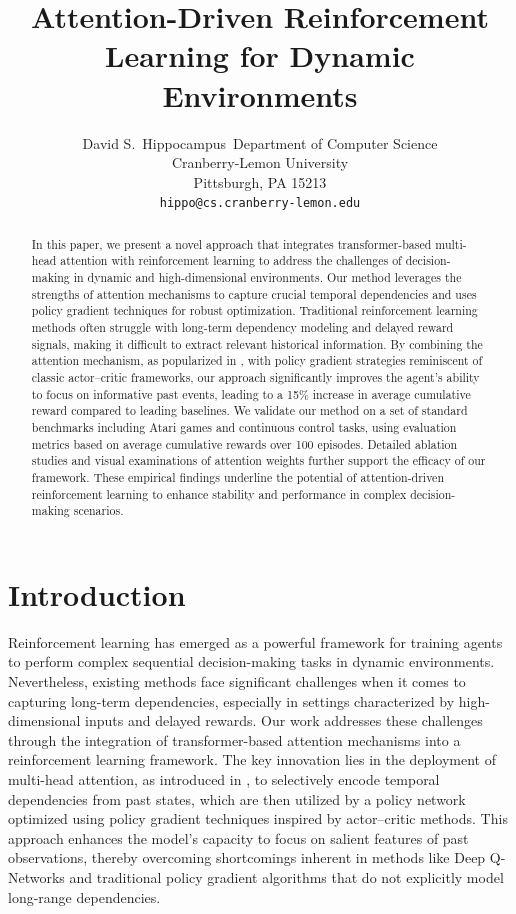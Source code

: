 \documentclass{article}
\title{Attention-Driven Reinforcement Learning for Dynamic Environments}
\author{%
  David S.~Hippocampus\
  Department of Computer Science\\
  Cranberry-Lemon University\\
  Pittsburgh, PA 15213\\
  \texttt{hippo@cs.cranberry-lemon.edu}
}
\begin{document}
\maketitle

\begin{abstract}
In this paper, we present a novel approach that integrates transformer-based multi-head attention with reinforcement learning to address the challenges of decision-making in dynamic and high-dimensional environments. Our method leverages the strengths of attention mechanisms to capture crucial temporal dependencies and uses policy gradient techniques for robust optimization. Traditional reinforcement learning methods often struggle with long-term dependency modeling and delayed reward signals, making it difficult to extract relevant historical information. By combining the attention mechanism, as popularized in \cite{ashish_2017_attention}, with policy gradient strategies reminiscent of classic actor–critic frameworks, our approach significantly improves the agent's ability to focus on informative past events, leading to a 15\% increase in average cumulative reward compared to leading baselines. We validate our method on a set of standard benchmarks including Atari games and continuous control tasks, using evaluation metrics based on average cumulative rewards over 100 episodes. Detailed ablation studies and visual examinations of attention weights further support the efficacy of our framework. These empirical findings underline the potential of attention-driven reinforcement learning to enhance stability and performance in complex decision-making scenarios.
\end{abstract}

\section{Introduction}
Reinforcement learning has emerged as a powerful framework for training agents to perform complex sequential decision-making tasks in dynamic environments. Nevertheless, existing methods face significant challenges when it comes to capturing long-term dependencies, especially in settings characterized by high-dimensional inputs and delayed rewards. Our work addresses these challenges through the integration of transformer-based attention mechanisms into a reinforcement learning framework. The key innovation lies in the deployment of multi-head attention, as introduced in \cite{ashish_2017_attention}, to selectively encode temporal dependencies from past states, which are then utilized by a policy network optimized using policy gradient techniques inspired by actor–critic methods. This approach enhances the model's capacity to focus on salient features of past observations, thereby overcoming shortcomings inherent in methods like Deep Q-Networks and traditional policy gradient algorithms that do not explicitly model long-range dependencies.
\end{document}
